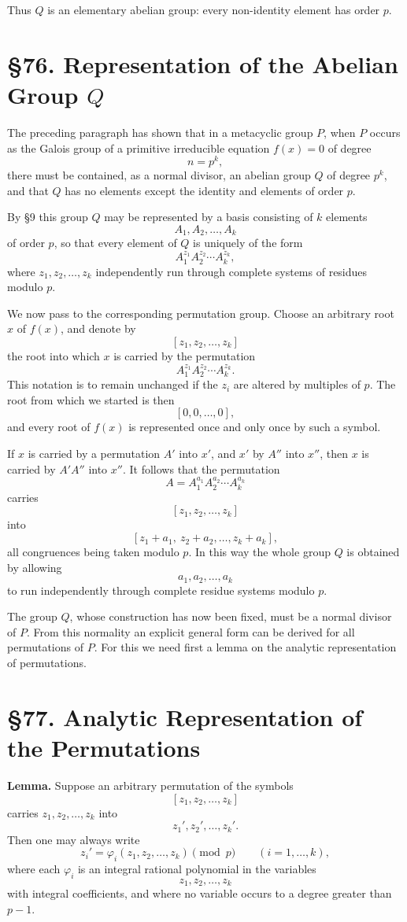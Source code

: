 \documentclass[11pt,a4paper]{book}
\newcommand{\webersection}[2]{\clearpage\section*{\S #1. #2}}
\begin{document}
Thus \(Q\) is an elementary abelian group: every non-identity element has order \(p\).

\webersection{76}{Representation of the Abelian Group \(Q\)}

The preceding paragraph has shown that in a metacyclic group \(P\), when \(P\) occurs as the Galois group of a primitive irreducible equation \(f(x)=0\) of degree
\[
 n=p^k,
\]
there must be contained, as a normal divisor, an abelian group \(Q\) of degree \(p^k\), and that \(Q\) has no elements except the identity and elements of order \(p\).

By \S 9 this group \(Q\) may be represented by a basis consisting of \(k\) elements
\[
 A_1,A_2,\ldots,A_k
\]
of order \(p\), so that every element of \(Q\) is uniquely of the form
\[
 A_1^{z_1}A_2^{z_2}\cdots A_k^{z_k},
\]
where \(z_1,z_2,\ldots,z_k\) independently run through complete systems of residues modulo \(p\).

We now pass to the corresponding permutation group.  Choose an arbitrary root \(x\) of \(f(x)\), and denote by
\[
 [z_1,z_2,\ldots,z_k]
\]
the root into which \(x\) is carried by the permutation
\[
 A_1^{z_1}A_2^{z_2}\cdots A_k^{z_k}.
\]
This notation is to remain unchanged if the \(z_i\) are altered by multiples of \(p\).  The root from which we started is then
\[
 [0,0,\ldots,0],
\]
and every root of \(f(x)\) is represented once and only once by such a symbol.

If \(x\) is carried by a permutation \(A'\) into \(x'\), and \(x'\) by \(A''\) into \(x''\), then \(x\) is carried by \(A'A''\) into \(x''\).  It follows that the permutation
\[
 A=A_1^{a_1}A_2^{a_2}\cdots A_k^{a_k}
\]
carries
\[
 [z_1,z_2,\ldots,z_k]
\]
into
\[
 [z_1+a_1,\ z_2+a_2,\ldots,z_k+a_k],
\]
all congruences being taken modulo \(p\).  In this way the whole group \(Q\) is obtained by allowing
\[
 a_1,a_2,\ldots,a_k
\]
to run independently through complete residue systems modulo \(p\).

The group \(Q\), whose construction has now been fixed, must be a normal divisor of \(P\).  From this normality an explicit general form can be derived for all permutations of \(P\).  For this we need first a lemma on the analytic representation of permutations.

\webersection{77}{Analytic Representation of the Permutations}

\textbf{Lemma.}  Suppose an arbitrary permutation of the symbols
\[
 [z_1,z_2,\ldots,z_k]
\]
carries \(z_1,z_2,\ldots,z_k\) into
\[
 z_1',z_2',\ldots,z_k'.
\]
Then one may always write
\[
 z_i'=\varphi_i(z_1,z_2,\ldots,z_k)\pmod p
 \qquad (i=1,\ldots,k),
\]
where each \(\varphi_i\) is an integral rational polynomial in the variables
\[
 z_1,z_2,\ldots,z_k
\]
with integral coefficients, and where no variable occurs to a degree greater than \(p-1\).
\end{document}
